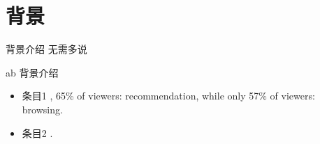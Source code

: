 \section{背景}

\begin{frame}
	背景介绍 无需多说
\end{frame}

\begin{frame}{a}{b}
	背景介绍
	\vspace{1em}
	\begin{itemize}
		\item 条目1 , 65\% of viewers: recommendation, while only 57\% of viewers:  browsing.
		\item 条目2 .
	\end{itemize}
\end{frame}

